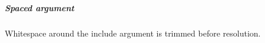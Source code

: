 \subparagraph{Spaced argument}
Whitespace around the include argument is trimmed before resolution.
